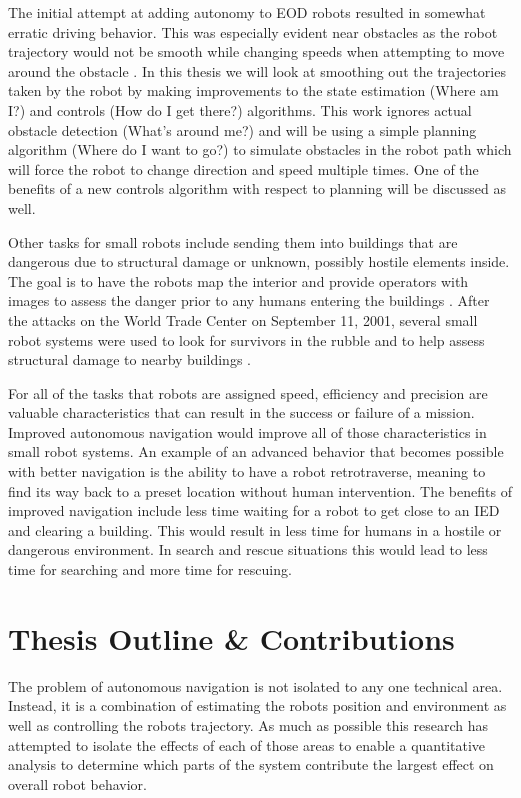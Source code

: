 The initial attempt at adding autonomy to EOD robots resulted in somewhat erratic driving behavior. This was especially evident near obstacles as the robot trajectory would not be smooth while changing speeds when attempting to move around the obstacle \cite{Bruch00}. In this thesis we will look at smoothing out the trajectories taken by the robot by making improvements to the state estimation (Where am I?) and controls (How do I get there?) algorithms. This work ignores actual obstacle detection (What's around me?) and will be using a simple planning algorithm (Where do I want to go?) to simulate obstacles in the robot path which will force the robot to change direction and speed multiple times. One of the benefits of a new controls algorithm with respect to planning will be discussed as well.

Other tasks for small robots include sending them into buildings that are dangerous due to structural damage or unknown, possibly hostile elements inside. The goal is to have the robots map the interior and provide operators with images to assess the danger prior to any humans entering the buildings \cite{CongressUGV06}. After the attacks on the World Trade Center on September 11, 2001, several small robot systems were used to look for survivors in the rubble and to help assess structural damage to nearby buildings \cite{Everett02}.

For all of the tasks that robots are assigned speed, efficiency and precision are valuable characteristics that can result in the success or failure of a mission. Improved autonomous navigation would improve all of those characteristics in small robot systems. An example of an advanced behavior that becomes possible with better navigation is the ability to have a robot retrotraverse, meaning to find its way back to a preset location without human intervention. The benefits of improved navigation include less time waiting for a robot to get close to an IED and clearing a building. This would result in less time for humans in a hostile or dangerous environment. In search and rescue situations this would lead to less time for searching and more time for rescuing.

\section{Thesis Outline \& Contributions}
\label{sec:outline}
The problem of autonomous navigation is not isolated to any one technical area. Instead, it is a combination of estimating the robots position and environment as well as controlling the robots trajectory. As much as possible this research has attempted to isolate the effects of each of those areas to enable a quantitative analysis to determine which parts of the system contribute the largest effect on overall robot behavior.

